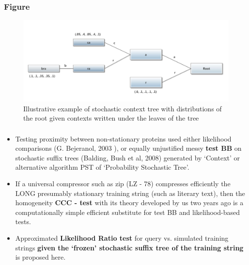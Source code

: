 \documentclass{beamer}
\begin{document}
\begin{frame}
\frametitle{Figure}
\begin{figure}[h!]
  \centering
      \includegraphics[scale=0.30]{ContextTree.jpg}
  \caption{Illustrative example of stochastic context tree with distributions of the root given contexts written under the leaves of the tree}
\label{fig:ContextTreeExample}
\end{figure}
\end{frame}
\begin{frame}
\frametitle{}
 \begin{itemize}


\item Testing proximity between non-stationary proteins used either likelihood comparisons (G. Bejeranol, 2003 ), or equally unjustified messy  {\bf test BB} on stochastic suffix trees (Balding, Bush et al, 2008) generated by `Context' or alternative algorithm PST of `Probability Stochastic Tree'.

\item If a universal compressor such as zip (LZ - 78) compresses efficiently the LONG presumably stationary training string (such as literary text),  then the homogeneity {\bf CCC - test} with its theory developed by us two years ago is a computationally simple efficient substitute for test BB and likelihood-based tests.\


 \item Approximated  {\bf Likelihood Ratio test}  for query vs. simulated training strings {\bf given the `frozen' stochastic suffix tree of the training string} is proposed here.\
\end{itemize}
\end{frame}
\end{document}

